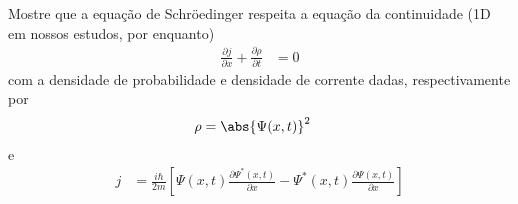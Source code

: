 \begin{prob}
	Mostre que a equação de Schröedinger respeita a equação da continuidade (1D em nossos estudos, por enquanto)	
	\begin{align}
		\frac{\partial j}{\partial x}+\frac{\partial \rho}{\partial t} &= 0
	\end{align}
	com a densidade de probabilidade e  densidade de corrente dadas, respectivamente por
	\begin{align}
		\rho &= \abs{\Psi(x,t)}^{2}
	\end{align}
	e
	\begin{align}
		j &= \frac{i \hbar}{2m}\left[\Psi(x,t)\frac{\partial \Psi^{*}(x,t)}{\partial x}-\Psi^{*}(x,t)\frac{\partial \Psi(x,t)}{\partial x}\right]
	\end{align}
\end{prob}
